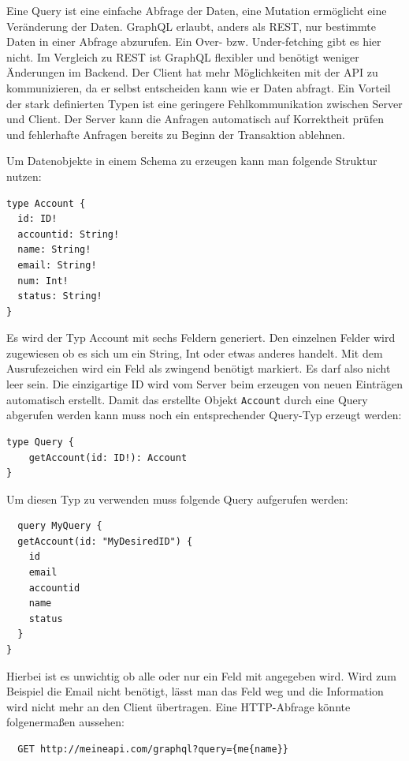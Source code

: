 Eine Query ist eine einfache Abfrage der Daten, eine Mutation ermöglicht eine Veränderung der Daten.
GraphQL erlaubt, anders als REST, nur bestimmte Daten in einer Abfrage abzurufen. Ein Over- bzw. Under-fetching gibt es hier nicht.
Im Vergleich zu REST ist GraphQL flexibler und benötigt weniger Änderungen im Backend.
Der Client hat mehr Möglichkeiten mit der API zu kommunizieren, da er selbst entscheiden kann wie er Daten abfragt.
Ein Vorteil der stark definierten Typen ist eine geringere Fehlkommunikation zwischen Server und Client.
Der Server kann die Anfragen automatisch auf Korrektheit prüfen und fehlerhafte Anfragen bereits zu Beginn der Transaktion ablehnen.

Um Datenobjekte in einem Schema zu erzeugen kann man folgende Struktur nutzen:
\begin{verbatim}
type Account {
  id: ID!
  accountid: String!
  name: String!
  email: String!
  num: Int!
  status: String!
}
\end{verbatim}

Es wird der Typ Account mit sechs Feldern generiert.
Den einzelnen Felder wird zugewiesen ob es sich um ein String, Int oder etwas anderes handelt.
Mit dem Ausrufezeichen wird ein Feld als zwingend benötigt markiert.
Es darf also nicht leer sein. Die einzigartige ID wird vom Server beim erzeugen von neuen Einträgen automatisch erstellt.
Damit das erstellte Objekt \verb+Account+ durch eine Query abgerufen werden kann muss noch ein entsprechender Query-Typ erzeugt werden:

\begin{verbatim}
type Query {
	getAccount(id: ID!): Account
}

\end{verbatim}

Um diesen Typ zu verwenden muss folgende Query aufgerufen werden:

\begin{verbatim}
  query MyQuery {
  getAccount(id: "MyDesiredID") {
    id
    email
    accountid
    name
    status
  }
}
\end{verbatim}

Hierbei ist es unwichtig ob alle oder nur ein Feld mit angegeben wird.
Wird zum Beispiel die Email nicht benötigt, lässt man das Feld weg und die Information wird nicht mehr an den Client übertragen.\cite[]{GraphQL1}
Eine HTTP-Abfrage könnte folgenermaßen aussehen\cite[]{GraphQLHTTP}:

\begin{verbatim}
  GET http://meineapi.com/graphql?query={me{name}}

\end{verbatim}


